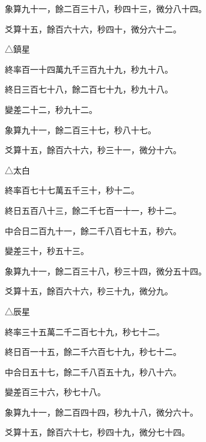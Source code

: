 \begin{pinyinscope}
 象算九十一，餘二百三十八，秒四十三，微分八十四。



 爻算十五，餘百六十六，秒四十，微分六十二。



 △鎮星



 終率百一十四萬九千三百九十九，秒九十八。



 終日三百七十八，餘二百七十九，秒九十八。



 變差二十二，秒九十二。



 象算九十一，餘二百三十七，秒八十七。



 爻算十五，餘百六十六，秒三十一，微分十六。



 △太白



 終率百七十七萬五千三十，秒十二。



 終日五百八十三，餘二千七百一十一，秒十二。



 中合日二百九十一，餘二千八百七十五，秒六。



 變差三十，秒五十三。



 象算九十一，餘二百三十八，秒三十四，微分五十四。



 爻算十五，餘百六十六，秒三十九，微分九。



 △辰星



 終率三十五萬二千二百七十九，秒七十二。



 終日百一十五，餘二千六百七十九，秒七十二。



 中合日五十七，餘二千八百五十九，秒八十六。



 變差百三十六，秒七十八。



 象算九十一，餘二百四十四，秒九十八，微分六十。



 爻算十五，餘百六十七，秒四十九，微分七十四。




\end{pinyinscope}
